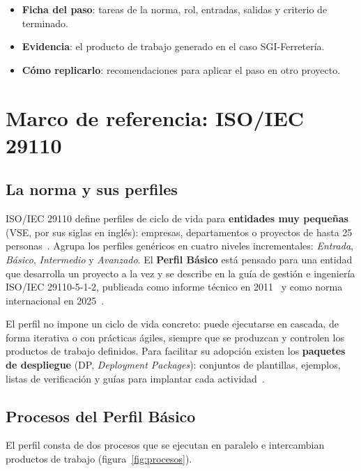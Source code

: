 \documentclass[11pt,a4paper]{article}
\begin{document}
\begin{itemize}
  \item \colorbox{verdeclaro}{\textbf{Ficha del paso}}: tareas de la norma, rol, entradas, salidas y criterio de terminado.
  \item \colorbox{azulcaja}{\textbf{Evidencia}}: el producto de trabajo generado en el caso SGI-Ferretería.
  \item \colorbox{ambarclaro}{\textbf{Cómo replicarlo}}: recomendaciones para aplicar el paso en otro proyecto.
\end{itemize}

\section{Marco de referencia: ISO/IEC 29110}\label{sec:marco}

\subsection{La norma y sus perfiles}
ISO/IEC 29110 define perfiles de ciclo de vida para \textbf{entidades muy pequeñas} (VSE, por sus siglas en inglés): empresas, departamentos o proyectos de hasta 25 personas~\cite{laporte2016}. Agrupa los perfiles genéricos en cuatro niveles incrementales: \emph{Entrada}, \emph{Básico}, \emph{Intermedio} y \emph{Avanzado}. El \textbf{Perfil Básico} está pensado para una entidad que desarrolla un proyecto a la vez y se describe en la guía de gestión e ingeniería ISO/IEC 29110-5-1-2, publicada como informe técnico en 2011~\cite{iso2011} y como norma internacional en 2025~\cite{iso2025}.

El perfil no impone un ciclo de vida concreto: puede ejecutarse en cascada, de forma iterativa o con prácticas ágiles, siempre que se produzcan y controlen los productos de trabajo definidos. Para facilitar su adopción existen los \textbf{paquetes de despliegue} (DP, \emph{Deployment Packages}): conjuntos de plantillas, ejemplos, listas de verificación y guías para implantar cada actividad~\cite{etsdp}.

\subsection{Procesos del Perfil Básico}
El perfil consta de dos procesos que se ejecutan en paralelo e intercambian productos de trabajo (figura~\ref{fig:procesos}).
\end{document}
